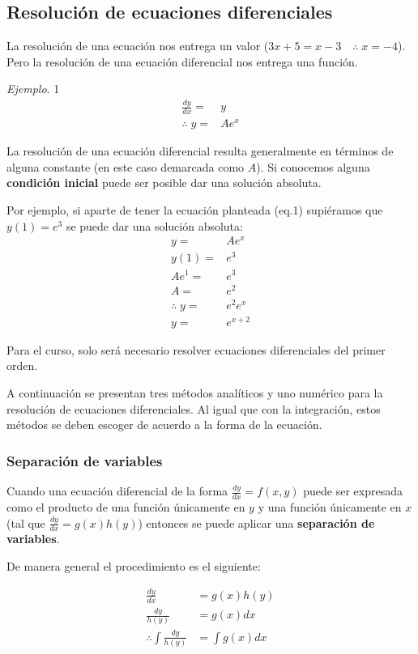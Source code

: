 \documentclass[spanish,12pt]{article}
\newcommand{\dydx}{\frac{dy}{dx}}
\begin{document}
\subsection{Resolución de ecuaciones diferenciales}

La resolución de una ecuación nos entrega un valor ($3x+5=x-3\quad\therefore\;x=-4$). Pero la resolución de una ecuación diferencial nos entrega una función.

\textit{Ejemplo}. 1
\begin{align*}
    \dydx=&y\tag{eq.1}\\
    \therefore\;y=&Ae^x
\end{align*}

La resolución de una ecuación diferencial resulta generalmente en términos de alguna constante (en este caso demarcada como $A$). Si conocemos alguna \textbf{condición inicial} puede ser posible dar una solución absoluta.

Por ejemplo, si aparte de tener la ecuación planteada (eq.1) supiéramos que $y(1)=e^3$ se puede dar una solución absoluta:
\begin{align*}
    y=&Ae^x\\
    y(1)=&e^3\\
    Ae^1=&e^3\\
    A=&e^2\\
    \therefore\;y=&e^2e^x\\
    y=&e^{x+2}
\end{align*}

Para el curso, solo será necesario resolver ecuaciones diferenciales del primer orden. 

A continuación se presentan tres métodos analíticos y uno numérico para la resolución de ecuaciones diferenciales. Al igual que con la integración, estos métodos se deben escoger de acuerdo a la forma de la ecuación. 

\subsubsection{Separación de variables}

Cuando una ecuación diferencial de la forma $\dydx=f(x,y)$ puede ser expresada como el producto de una función únicamente en $y$ y una función únicamente en $x$ (tal que $\dydx=g(x)h(y)$) entonces se puede aplicar una \textbf{separación de variables}. 

De manera general el procedimiento es el siguiente:

\begin{align*}
    \dydx&=g(x)h(y)\\
    \frac{dy}{h(y)}&=g(x)dx\\
    \therefore\int\frac{dy}{h(y)}&=\int g(x)dx
\end{align*}
\end{document}
